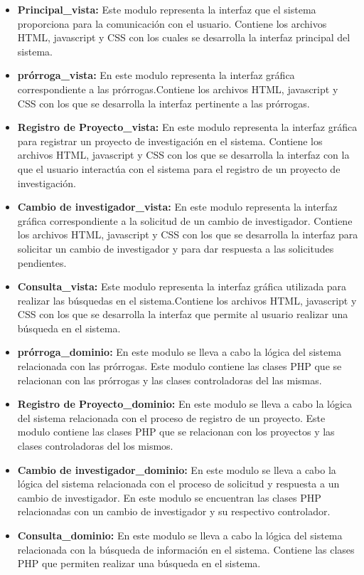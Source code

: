 \documentclass[12pt,oneside,letterpaper]{report}
\begin{document}
\begin{itemize}
 \item \textbf{Principal\_vista:} Este modulo representa la interfaz que el sistema proporciona para la comunicación con el usuario. Contiene los archivos HTML,  javascript y CSS con los cuales se desarrolla la interfaz principal del sistema.
 \item \textbf{prórroga\_vista:} En este modulo representa la interfaz gráfica correspondiente a las prórrogas.Contiene los archivos HTML, javascript y CSS con los que se desarrolla la interfaz pertinente a las prórrogas.
 \item \textbf{Registro de Proyecto\_vista:} En este modulo representa la interfaz gráfica para registrar un proyecto de investigación en el sistema. Contiene los archivos HTML, javascript y CSS con los que se desarrolla la interfaz con la que el usuario interactúa con el sistema para el registro de un proyecto de investigación.
 \item \textbf{Cambio de investigador\_vista:} En este modulo representa la interfaz gráfica correspondiente a la solicitud de un cambio de investigador. Contiene los archivos HTML, javascript y CSS con los que se desarrolla la interfaz para solicitar un cambio de investigador y para dar respuesta a las solicitudes pendientes.
 \item \textbf{Consulta\_vista:} Este modulo  representa la interfaz gráfica utilizada para realizar las búsquedas en el sistema.Contiene los archivos HTML, javascript y CSS con los que se desarrolla la interfaz que permite al usuario realizar una búsqueda en el sistema.
 \item \textbf{prórroga\_dominio:} En este modulo se lleva a cabo la lógica del sistema relacionada con las prórrogas. Este modulo contiene las clases PHP que se relacionan con las prórrogas y las clases controladoras del las mismas.
 \item \textbf{Registro de Proyecto\_dominio:} En este modulo se lleva a cabo la lógica del sistema relacionada con el proceso de registro de un proyecto. Este modulo contiene las clases PHP que se relacionan con los proyectos y las clases controladoras del los mismos.
 \item \textbf{Cambio de investigador\_dominio:} En este modulo se lleva a cabo la lógica del sistema relacionada con el proceso de solicitud y respuesta a un cambio de investigador. En este modulo se encuentran las clases PHP relacionadas con un cambio de investigador y su respectivo controlador.
 \item \textbf{Consulta\_dominio:} En este modulo se lleva a cabo la lógica del sistema relacionada con la búsqueda de información en el sistema. Contiene las clases PHP que permiten realizar una búsqueda en el sistema.

\end{itemize}
\end{document}
